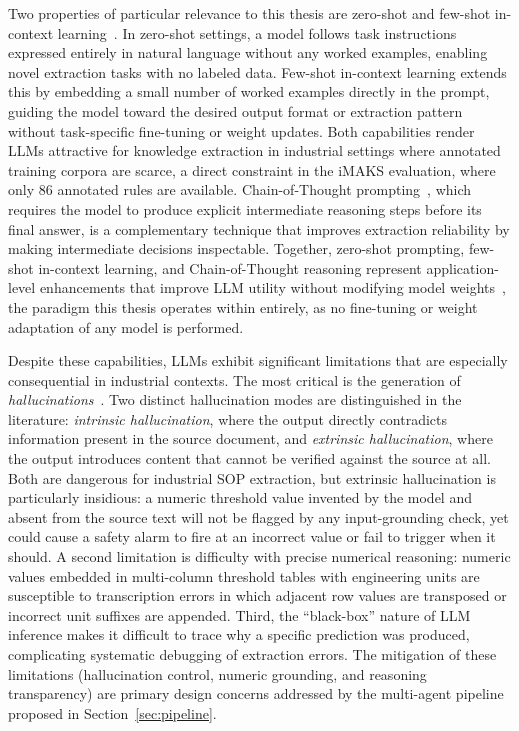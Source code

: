 ﻿\documentclass[11pt]{article}
\begin{document}
Two properties of particular relevance to this thesis are zero-shot and few-shot in-context learning~\cite{brown2020gpt3}. In zero-shot settings, a model follows task instructions expressed entirely in natural language without any worked examples, enabling novel extraction tasks with no labeled data. Few-shot in-context learning extends this by embedding a small number of worked examples directly in the prompt, guiding the model toward the desired output format or extraction pattern without task-specific fine-tuning or weight updates. Both capabilities render LLMs attractive for knowledge extraction in industrial settings where annotated training corpora are scarce, a direct constraint in the iMAKS evaluation, where only 86 annotated rules are available. Chain-of-Thought prompting~\cite{wei2022cot}, which requires the model to produce explicit intermediate reasoning steps before its final answer, is a complementary technique that improves extraction reliability by making intermediate decisions inspectable. Together, zero-shot prompting, few-shot in-context learning, and Chain-of-Thought reasoning represent application-level enhancements that improve LLM utility without modifying model weights~\cite{katanforoosh2025cs230}, the paradigm this thesis operates within entirely, as no fine-tuning or weight adaptation of any model is performed.

Despite these capabilities, LLMs exhibit significant limitations that are especially consequential in industrial contexts. The most critical is the generation of \emph{hallucinations}~\cite{ji2023hallucination}. Two distinct hallucination modes are distinguished in the literature: \emph{intrinsic hallucination}, where the output directly contradicts information present in the source document, and \emph{extrinsic hallucination}, where the output introduces content that cannot be verified against the source at all. Both are dangerous for industrial SOP extraction, but extrinsic hallucination is particularly insidious: a numeric threshold value invented by the model and absent from the source text will not be flagged by any input-grounding check, yet could cause a safety alarm to fire at an incorrect value or fail to trigger when it should. A second limitation is difficulty with precise numerical reasoning: numeric values embedded in multi-column threshold tables with engineering units are susceptible to transcription errors in which adjacent row values are transposed or incorrect unit suffixes are appended. Third, the ``black-box'' nature of LLM inference makes it difficult to trace why a specific prediction was produced, complicating systematic debugging of extraction errors. The mitigation of these limitations (hallucination control, numeric grounding, and reasoning transparency) are primary design concerns addressed by the multi-agent pipeline proposed in Section~\ref{sec:pipeline}.
\end{document}
